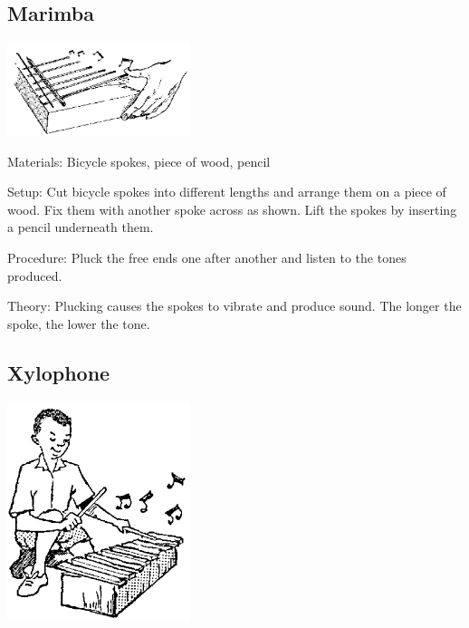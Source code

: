 \begin{multicols}{2}
\subsection{Marimba}

\begin{center}
\includegraphics[width=0.4\textwidth]{./img/source/marimba.png}
\end{center}

\begin{description*}
\item[Materials:]{Bicycle spokes, piece of wood, pencil}
\item[Setup:]{Cut bicycle spokes into different lengths and arrange them on a piece of wood. Fix them with another spoke across as shown. Lift the spokes by inserting a pencil underneath them.}
\item[Procedure:]{Pluck the free ends one after another and listen to the tones produced.}
\item[Theory:]{Plucking causes the spokes to vibrate and produce sound. The longer the spoke, the lower the tone.}
\end{description*}

\subsection{Xylophone}

\begin{center}
\includegraphics[width=0.4\textwidth]{./img/source/xylophone.png}
\end{center}


\end{multicols}
